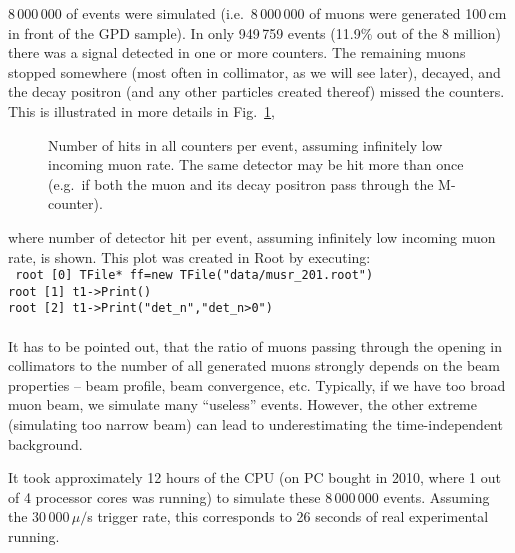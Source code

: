 \documentclass[twoside]{dis04}
\begin{document}
8\,000\,000 of events were simulated
(i.e.\ 8\,000\,000 of muons were generated 100\,cm in front of
the GPD sample). 
In only 949\,759 events (11.9\% out of the 8 million) there was a signal detected
in one or more counters.  The remaining muons stopped somewhere (most
often in collimator, as we will see later), decayed, and the decay positron
(and any other particles created thereof) missed the counters.
This is illustrated in more details in Fig.~\ref{det_n},
%
\begin{figure}[tbp]\centering
{}
\caption{Number of hits in all counters per event, assuming infinitely low incoming muon
rate. The same detector may be hit more than once (e.g.\ if both the muon and its decay 
positron pass through the M-counter).}
\label{det_n}
\end{figure}
%
where number of detector hit per event, assuming infinitely low incoming muon
rate, is shown.  This plot was created in Root by executing:\\[1em]
{\tt 
root [0] TFile* ff=new TFile("data/musr\_201.root") \\
root [1] t1->Print() \\
root [2] t1->Print("det\_n","det\_n>0") \\
}\\[1em]
%
It has to be pointed out, that the ratio of muons passing through the opening
in collimators to the number of all generated muons strongly depends on the
beam properties -- beam profile, beam convergence, etc.  Typically, if we have
too broad muon beam, we simulate
many ``useless'' events.  However, the other extreme (simulating too narrow
beam) can lead to underestimating the time-independent background.

It took approximately 12 hours of the CPU (on PC bought in 2010, where 1 out 
of 4 processor cores was running) to simulate these 8\,000\,000 events.
Assuming the 30\,000\,$\mu/$s trigger rate, this corresponds to 26 seconds
of real experimental running.
\end{document}
